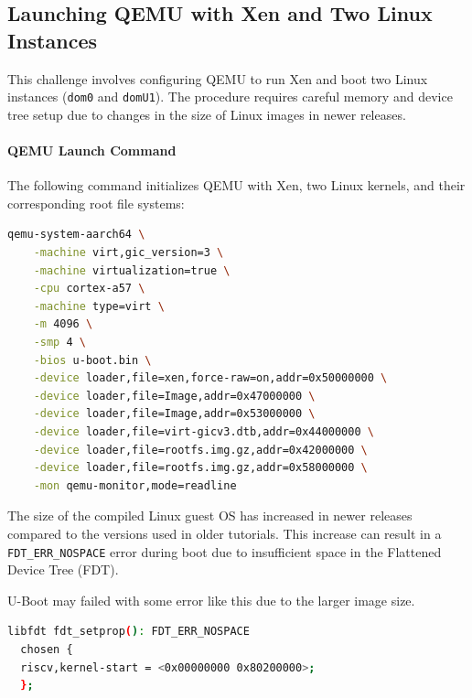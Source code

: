 \documentclass[acmtog]{acmart}
\begin{document}
\subsection{Launching QEMU with Xen and Two Linux Instances}

This challenge involves configuring QEMU to run Xen and boot two Linux instances (\texttt{dom0} and \texttt{domU1}). The procedure requires careful memory and device tree setup due to changes in the size of Linux images in newer releases.

\paragraph{QEMU Launch Command}

The following command initializes QEMU with Xen, two Linux kernels, and their corresponding root file systems:

\begin{lstlisting}[language=bash, caption=Designed Device Layout]
qemu-system-aarch64 \
    -machine virt,gic_version=3 \
    -machine virtualization=true \
    -cpu cortex-a57 \
    -machine type=virt \
    -m 4096 \
    -smp 4 \
    -bios u-boot.bin \
    -device loader,file=xen,force-raw=on,addr=0x50000000 \
    -device loader,file=Image,addr=0x47000000 \
    -device loader,file=Image,addr=0x53000000 \
    -device loader,file=virt-gicv3.dtb,addr=0x44000000 \
    -device loader,file=rootfs.img.gz,addr=0x42000000 \
    -device loader,file=rootfs.img.gz,addr=0x58000000 \
    -mon qemu-monitor,mode=readline
\end{lstlisting}


The size of the compiled Linux guest OS has increased in newer releases compared to the versions used in older tutorials. This increase can result in a \texttt{FDT\_ERR\_NOSPACE} error during boot due to insufficient space in the Flattened Device Tree (FDT).

U-Boot may failed with some error like this due to the larger image size.
\begin{lstlisting}[language=bash, caption=U-Boot error due to different image size]
  libfdt fdt_setprop(): FDT_ERR_NOSPACE
  chosen {
  riscv,kernel-start = <0x00000000 0x80200000>;
  };
\end{lstlisting}
\end{document}
